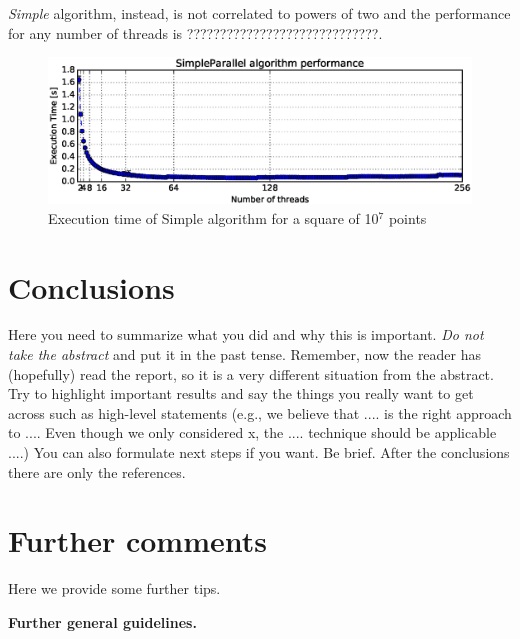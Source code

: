 \documentclass[letterpaper]{article}
\newcommand{\mypar}[1]{{\bf #1.}}
\begin{document}
\textit{Simple} algorithm, instead, is not correlated to powers of two and the performance for any number of threads is ?????????????????????????????.

\begin{figure}[!ht]\centering
  \includegraphics[scale=0.33]{./plots/total.eps}
  \caption{Execution time of Simple algorithm for a square of 10$^7$ points\label{SimpleParallel Total}}
\end{figure}


\section{Conclusions}

Here you need to summarize what you did and why this is
important. {\em Do not take the abstract} and put it in the past
tense. Remember, now the reader has (hopefully) read the report, so it
is a very different situation from the abstract. Try to highlight
important results and say the things you really want to get across
such as high-level statements (e.g., we believe that .... is the right
approach to .... Even though we only considered x, the
.... technique should be applicable ....) You can also formulate next
steps if you want. Be brief. After the conclusions there are only the references.

\section{Further comments}

Here we provide some further tips.

\mypar{Further general guidelines}
\end{document}
